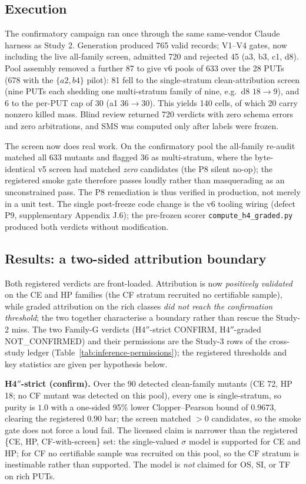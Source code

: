 \documentclass[manuscript,screen,review]{acmart}
\begin{document}
\subsection{Execution}\label{study3-execution}

The confirmatory campaign ran once through the same same-vendor Claude harness
as Study 2. Generation produced 765 valid records; V1--V4 gates, now including
the live all-family screen, admitted 720 and rejected 45 (a3, b3, c1, d8). Pool
assembly removed a further 87 to give v6 pools of 633 over the 28 PUTs (678 with
the \(\{a2, b4\}\) pilot): 81 fell to the single-stratum clean-attribution screen
(nine PUTs each shedding one multi-stratum family of nine, e.g.\ d8 $18\to9$),
and 6 to the per-PUT cap of 30 (a1 $36\to30$). This yields 140 cells, of which
20 carry nonzero killed mass. Blind review returned 720 verdicts with zero schema
errors and zero arbitrations, and SMS was computed only after labels were frozen.

The screen now does real work. On the confirmatory pool the all-family re-audit
matched all 633 mutants and flagged 36 as multi-stratum, where the
byte-identical v5 screen had matched \emph{zero} candidates (the P8 silent
no-op); the registered smoke gate therefore passes loudly rather than
masquerading as an unconstrained pass. The P8 remediation is thus verified in
production, not merely in a unit test. The single post-freeze code change is the
v6 tooling wiring (defect P9, supplementary Appendix J.6); the pre-frozen scorer
\texttt{compute\_h4\_graded.py} produced both verdicts without modification.

\subsection{Results: a two-sided attribution boundary}\label{study3-scoreboard}

Both registered verdicts are front-loaded. Attribution is now \emph{positively
validated} on the CE and HP families (the CF stratum recruited no certifiable
sample), while graded attribution on the rich classes \emph{did not reach the
confirmation threshold}; the two together characterise a boundary rather than
rescue the Study-2 miss. The two Family-G verdicts (H4\('' \)-strict CONFIRM,
H4\('' \)-graded NOT\_CONFIRMED) and their permissions are the Study-3 rows of
the cross-study ledger (Table~\ref{tab:inference-permissions}); the registered
thresholds and key statistics are given per hypothesis below.

\textbf{H4\('' \)-strict (confirm).} Over the 90 detected clean-family mutants
(CE 72, HP 18; no CF mutant was detected on this pool), every one is
single-stratum, so purity is \(1.0\) with a one-sided 95\% lower
Clopper--Pearson bound of \(0.9673\), clearing the registered \(0.90\) bar; the
screen matched \(>0\) candidates, so the smoke gate does not force a loud fail.
The licensed claim is narrower than the registered \{CE, HP, CF-with-screen\}
set: the single-valued \(\sigma\) model is supported for CE and HP; for CF no
certifiable sample was recruited on this pool, so the CF stratum is
inestimable rather than supported. The model is \emph{not} claimed for
OS, SI, or TF on rich PUTs.
\end{document}
